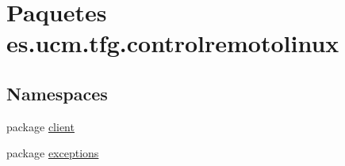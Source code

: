 \hypertarget{namespacees_1_1ucm_1_1tfg_1_1controlremotolinux}{\section{Paquetes es.\-ucm.\-tfg.\-controlremotolinux}
\label{namespacees_1_1ucm_1_1tfg_1_1controlremotolinux}
}
\subsection*{Namespaces}
\begin{DoxyCompactItemize}
\item 
package \hyperlink{namespacees_1_1ucm_1_1tfg_1_1controlremotolinux_1_1client}{client}
\item 
package \hyperlink{namespacees_1_1ucm_1_1tfg_1_1controlremotolinux_1_1exceptions}{exceptions}
\end{DoxyCompactItemize}
